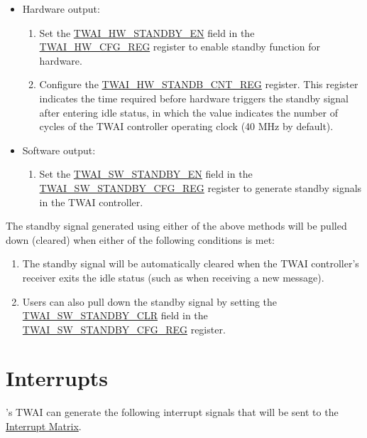 \documentclass[main\_\_EN.tex]{subfiles}
\begin{document}
\begin{itemize}
    \item Hardware output:
    \begin{enumerate}
        \item Set the \hyperref[fielddesc:TWAIHWSTANDBYEN]{TWAI\_HW\_STANDBY\_EN} field in the \hyperref[regdesc:TWAIHWCFGREG]{TWAI\_HW\_CFG\_REG} register to enable standby function for hardware.
        \item Configure the \hyperref[regdesc:TWAIHWSTANDBYCNTREG]{TWAI\_HW\_STANDB\_CNT\_REG} register. This register indicates the time required before hardware triggers the standby signal after entering idle status, in which the value indicates the number of cycles of the TWAI controller operating clock (40 MHz by default).
    \end{enumerate}
    \item Software output:
    \begin{enumerate}
        \item Set the \hyperref[fielddesc:TWAISWSTANDBYEN]{TWAI\_SW\_STANDBY\_EN} field in the \hyperref[regdesc:TWAISWSTANDBYCFGREG]{TWAI\_SW\_STANDBY\_CFG\_REG} register to generate standby signals in the TWAI controller.
    \end{enumerate}
\end{itemize}

The standby signal generated using either of the above methods will be pulled down (cleared) when either of the following conditions is met:
\begin{enumerate}
    \item The standby signal will be automatically cleared when the TWAI controller's receiver exits the idle status (such as when receiving a new message).
    \item Users can also pull down the standby signal by setting the \hyperref[fielddesc:TWAISWSTANDBYCLR]{TWAI\_SW\_STANDBY\_CLR} field in the \hyperref[regdesc:TWAISWSTANDBYCFGREG]{TWAI\_SW\_STANDBY\_CFG\_REG} register.
\end{enumerate}



\clearpage
\section{Interrupts}
\label{sec:twai-interrupt-management}

\chipname{}'s TWAI can generate the following interrupt signals that will be sent to the \hyperref[mod:intmtrx]{Interrupt Matrix}.
\end{document}

